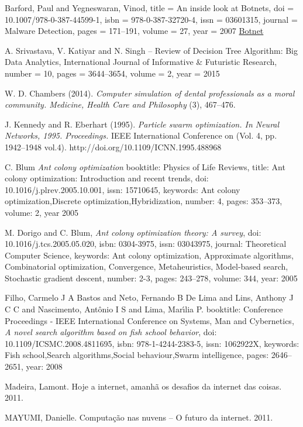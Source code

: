 \documentclass[conference,compsoc]{IEEEtran}
\begin{document}
\begin{thebibliography}{1}
Barford, Paul and Yegneswaran, Vinod,
title = {{An inside look at Botnets}},
doi = {10.1007/978-0-387-44599-1},
isbn = {978-0-387-32720-4},
issn = {03601315},
journal = {Malware Detection},
pages = {171--191},
volume = {27},
year = {2007}
\href{http://www.springerlink.com/index/10.1007/978-0-387-44599-1}{Botnet}


A. Srivastava, V. Katiyar and N. Singh -- Review of Decision Tree Algorithm: Big Data Analytics,
International Journal of Informative \& Futuristic Research,
number = {10},
pages = {3644--3654},
volume = {2},
year = {2015}

W. D. Chambers (2014).
\emph{Computer simulation of dental professionals as a moral community. Medicine, Health Care and Philosophy}
(3), 467–476.

J. Kennedy and R. Eberhart (1995). 
\emph{Particle swarm optimization. In Neural Networks, 1995. Proceedings.}
IEEE International Conference on (Vol. 4, pp. 1942–1948 vol.4). http://doi.org/10.1109/ICNN.1995.488968

C. Blum
\emph{Ant colony optimization}
booktitle: {Physics of Life Reviews},
title: {{Ant colony optimization: Introduction and recent trends}},
doi: {10.1016/j.plrev.2005.10.001},
issn: {15710645},
keywords: {Ant colony optimization,Discrete optimization,Hybridization},
number: {4},
pages: {353--373},
volume: {2},
year {2005}

M. Dorigo and C. Blum,
\emph{Ant colony optimization theory: A survey},
doi: {10.1016/j.tcs.2005.05.020},
isbn: {0304-3975},
issn: {03043975},
journal: {Theoretical Computer Science},
keywords: {Ant colony optimization, Approximate algorithms, Combinatorial optimization, Convergence, Metaheuristics, Model-based search, Stochastic gradient descent},
number: {2-3},
pages: {243--278},
volume: {344},
year: {2005}

Filho, Carmelo J A Bastos and Neto, Fernando B De Lima and Lins, Anthony J C C and Nascimento, Ant\^{o}nio I S and Lima, Mar\'{\i}lia P.
booktitle: {Conference Proceedings - IEEE International Conference on Systems, Man and Cybernetics},
\emph{A novel search algorithm based on fish school behavior},
doi: {10.1109/ICSMC.2008.4811695},
isbn: {978-1-4244-2383-5},
issn: {1062922X},
keywords: {Fish school,Search algorithms,Social behaviour,Swarm intelligence},
pages: {2646--2651},
year: {2008}

Madeira, Lamont. Hoje a internet, amanhã os desafios da internet das coisas. 2011.

MAYUMI, Danielle. Computação nas nuvens – O futuro da internet. 2011.



\end{thebibliography}






\end{document}
